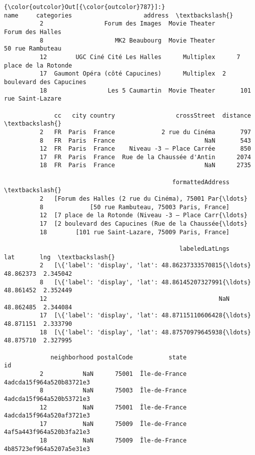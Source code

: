 \documentclass[11pt]{article}
\begin{document}
\begin{Verbatim}[commandchars=\\\{\}]
{\color{outcolor}Out[{\color{outcolor}787}]:}                               name     categories                    address  \textbackslash{}
          2                 Forum des Images  Movie Theater           Forum des Halles   
          8                    MK2 Beaubourg  Movie Theater           50 rue Rambuteau   
          12        UGC Ciné Cité Les Halles      Multiplex      7 place de la Rotonde   
          17  Gaumont Opéra (côté Capucines)      Multiplex  2 boulevard des Capucines   
          18                 Les 5 Caumartin  Movie Theater       101 rue Saint-Lazare   
          
              cc   city country                 crossStreet  distance  \textbackslash{}
          2   FR  Paris  France             2 rue du Cinéma       797   
          8   FR  Paris  France                         NaN       543   
          12  FR  Paris  France    Niveau -3 – Place Carrée       850   
          17  FR  Paris  France  Rue de la Chaussée d'Antin      2074   
          18  FR  Paris  France                         NaN      2735   
          
                                               formattedAddress  \textbackslash{}
          2   [Forum des Halles (2 rue du Cinéma), 75001 Par{\ldots}   
          8             [50 rue Rambuteau, 75003 Paris, France]   
          12  [7 place de la Rotonde (Niveau -3 – Place Carr{\ldots}   
          17  [2 boulevard des Capucines (Rue de la Chaussée{\ldots}   
          18        [101 rue Saint-Lazare, 75009 Paris, France]   
          
                                                 labeledLatLngs        lat       lng  \textbackslash{}
          2   [\{'label': 'display', 'lat': 48.86237333570815{\ldots}  48.862373  2.345042   
          8   [\{'label': 'display', 'lat': 48.86145207327991{\ldots}  48.861452  2.352449   
          12                                                NaN  48.862485  2.344084   
          17  [\{'label': 'display', 'lat': 48.87115110606428{\ldots}  48.871151  2.333790   
          18  [\{'label': 'display', 'lat': 48.87570979645938{\ldots}  48.875710  2.327995   
          
             neighborhood postalCode          state                        id  
          2           NaN      75001  Île-de-France  4adcda15f964a520b83721e3  
          8           NaN      75003  Île-de-France  4adcda15f964a520b53721e3  
          12          NaN      75001  Île-de-France  4adcda15f964a520af3721e3  
          17          NaN      75009  Île-de-France  4af5a443f964a520b3fa21e3  
          18          NaN      75009  Île-de-France  4b85723ef964a5207a5e31e3  
\end{Verbatim}
            
\end{document}
